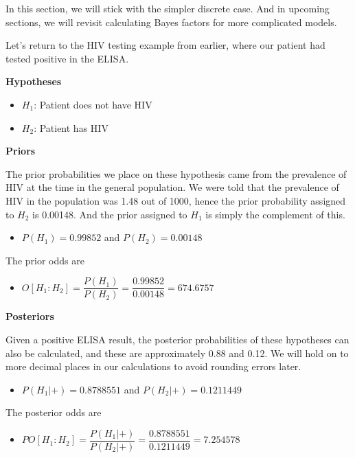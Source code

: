 \documentclass[]{book}
\providecommand{\tightlist}{%
  \setlength{\itemsep}{0pt}\setlength{\parskip}{0pt}}
\theoremstyle{definition}
\theoremstyle{definition}
\theoremstyle{definition}
\theoremstyle{remark}
\begin{document}
In this section, we will stick with the simpler discrete case. And in
upcoming sections, we will revisit calculating Bayes factors for more
complicated models.

Let's return to the HIV testing example from earlier, where our patient
had tested positive in the ELISA.

\textbf{Hypotheses}

\begin{itemize}
\tightlist
\item
  \(H_1\): Patient does not have HIV
\item
  \(H_2\): Patient has HIV
\end{itemize}

\textbf{Priors}

The prior probabilities we place on these hypothesis came from the
prevalence of HIV at the time in the general population. We were told
that the prevalence of HIV in the population was 1.48 out of 1000, hence
the prior probability assigned to \(H_2\) is 0.00148. And the prior
assigned to \(H_1\) is simply the complement of this.

\begin{itemize}
\tightlist
\item
  \(P(H_1) = 0.99852\) and \(P(H_2) = 0.00148\)
\end{itemize}

The prior odds are

\begin{itemize}
\tightlist
\item
  \(O[H_1:H_2] = \dfrac{P(H_1)}{P(H_2)} = \dfrac{0.99852}{0.00148} = 674.6757\)
\end{itemize}

\textbf{Posteriors}

Given a positive ELISA result, the posterior probabilities of these
hypotheses can also be calculated, and these are approximately 0.88 and
0.12. We will hold on to more decimal places in our calculations to
avoid rounding errors later.

\begin{itemize}
\tightlist
\item
  \(P(H_1|+) = 0.8788551\) and \(P(H_2|+) = 0.1211449\)
\end{itemize}

The posterior odds are

\begin{itemize}
\tightlist
\item
  \(PO[H_1:H_2] = \dfrac{P(H_1|+)}{P(H_2|+)} = \dfrac{0.8788551}{0.1211449} = 7.254578\)
\end{itemize}
\end{document}
